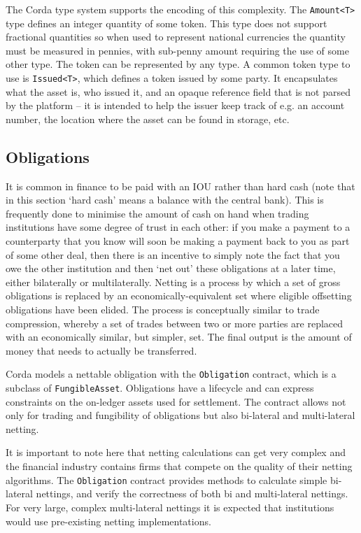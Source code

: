 \documentclass{article}
\begin{document}
The Corda type system supports the encoding of this complexity. The \texttt{Amount<T>} type defines an integer
quantity of some token. This type does not support fractional quantities so when used to represent national
currencies the quantity must be measured in pennies, with sub-penny amount requiring the use of some other type.
The token can be represented by any type. A common token type to use is \texttt{Issued<T>}, which defines a token
issued by some party. It encapsulates what the asset is, who issued it, and an opaque reference field that is not
parsed by the platform -- it is intended to help the issuer keep track of e.g. an account number, the location where
the asset can be found in storage, etc.

\subsection{Obligations}

It is common in finance to be paid with an IOU rather than hard cash (note that in this section `hard cash' means a
balance with the central bank). This is frequently done to minimise the amount of cash on hand when trading institutions
have some degree of trust in each other: if you make a payment to a counterparty that you know will soon be making a
payment back to you as part of some other deal, then there is an incentive to simply note the fact that you owe the
other institution and then `net out' these obligations at a later time, either bilaterally or multilaterally. Netting is
a process by which a set of gross obligations is replaced by an economically-equivalent set where eligible offsetting
obligations have been elided. The process is conceptually similar to trade compression, whereby a set of trades between
two or more parties are replaced with an economically similar, but simpler, set. The final output is the amount of money
that needs to actually be transferred.

Corda models a nettable obligation with the \texttt{Obligation} contract, which is a subclass of
\texttt{FungibleAsset}. Obligations have a lifecycle and can express constraints on the on-ledger assets used
for settlement. The contract allows not only for trading and fungibility of obligations but also bi-lateral and
multi-lateral netting.

It is important to note here that netting calculations can get very complex and the financial industry contains
firms that compete on the quality of their netting algorithms. The \texttt{Obligation} contract provides methods
to calculate  simple bi-lateral nettings, and verify the correctness of both bi and multi-lateral nettings. For
very large, complex multi-lateral nettings it is expected that institutions would use pre-existing netting
implementations.
\end{document}
